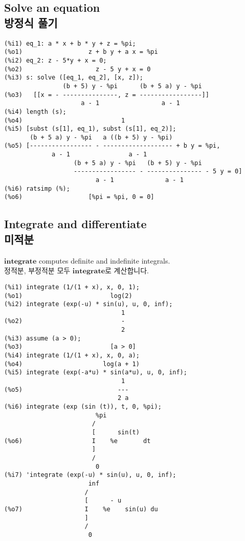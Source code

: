 \documentclass[12pt]{article}
\begin{document}
\subsection{Solve an equation \\ 방정식 풀기}

\begin{verbatim}
(%i1) eq_1: a * x + b * y + z = %pi;
(%o1)                  z + b y + a x = %pi
(%i2) eq_2: z - 5*y + x = 0;
(%o2)                    z - 5 y + x = 0
(%i3) s: solve ([eq_1, eq_2], [x, z]);
                (b + 5) y - %pi      (b + 5 a) y - %pi
(%o3)   [[x = - ---------------, z = -----------------]]
                     a - 1                 a - 1
(%i4) length (s);
(%o4)                           1
(%i5) [subst (s[1], eq_1), subst (s[1], eq_2)];
       (b + 5 a) y - %pi   a ((b + 5) y - %pi)
(%o5) [----------------- - ------------------- + b y = %pi, 
             a - 1                a - 1
                   (b + 5 a) y - %pi   (b + 5) y - %pi
                   ----------------- - --------------- - 5 y = 0]
                         a - 1              a - 1
(%i6) ratsimp (%);
(%o6)                  [%pi = %pi, 0 = 0]
\end{verbatim}

\subsection{Integrate and differentiate \\ 미적분}

$\mathbf{integrate}$ computes definite and indefinite integrals. \\
정적분, 부정적분 모두 $\mathbf{integrate}$로 계산합니다.

\begin{verbatim}
(%i1) integrate (1/(1 + x), x, 0, 1);
(%o1)                        log(2)
(%i2) integrate (exp(-u) * sin(u), u, 0, inf);
                                1
(%o2)                           -
                                2
(%i3) assume (a > 0);
(%o3)                        [a > 0]
(%i4) integrate (1/(1 + x), x, 0, a);
(%o4)                      log(a + 1)
(%i5) integrate (exp(-a*u) * sin(a*u), u, 0, inf);
                                1
(%o5)                          ---
                               2 a
(%i6) integrate (exp (sin (t)), t, 0, %pi);
                         %pi
                        /
                        [      sin(t)
(%o6)                   I    %e       dt
                        ]
                        /
                         0
(%i7) 'integrate (exp(-u) * sin(u), u, 0, inf);
                       inf
                      /
                      [      - u
(%o7)                 I    %e    sin(u) du
                      ]
                      /
                       0
\end{verbatim}
\end{document}

